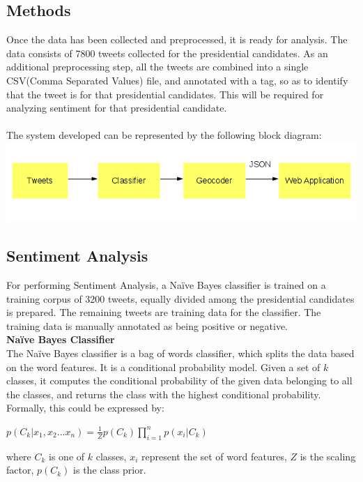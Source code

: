 \documentclass[twoside]{article}
\begin{document}
\begin{multicols}{2}
\section{Methods}
Once the data has been collected and preprocessed, it is ready for analysis. The data consists of 7800 tweets collected for the presidential candidates. As an additional preprocessing step, all the tweets are combined into a single CSV(Comma Separated Values) file, and annotated with a tag, so as to identify that the tweet is for that presidential candidates. This will be required for analyzing sentiment for that presidential candidate. \\ \\
The system developed can be represented by the following block diagram: \\
\includegraphics[width=1\columnwidth]{diagram}

\subsection{Sentiment Analysis}
For performing Sentiment Analysis, a Na\"{i}ve Bayes classifier\cite{naivebayes} is trained on a training corpus of 3200 tweets, equally divided among the presidential candidates is prepared. The remaining tweets are training data for the classifier. The training data is manually annotated as being positive or negative. \\
\textbf{Na\"{i}ve Bayes Classifier} \\
The Na\"{i}ve Bayes classifier is a bag of words classifier, which splits the data based on the word features. It is a conditional probability model. Given a set of $k$ classes, it computes the conditional probability of the given data belonging to all the classes, and returns the class with the highest conditional probability. Formally, this could be expressed by: \\
\begin{center}
$p(C_{k}|x_{1},x_{2}...x_{n})=\frac{1}{Z}p(C_{k})\prod_{i=1}^{n}p(x_{i}|C_{k})$
\end{center}  
where $C_{k}$ is one of $k$ classes, $x_{i}$ represent the set of word features, $Z$ is the scaling factor, $p(C_{k})$ is the class prior.\\
 

\end{multicols}
\end{document}
